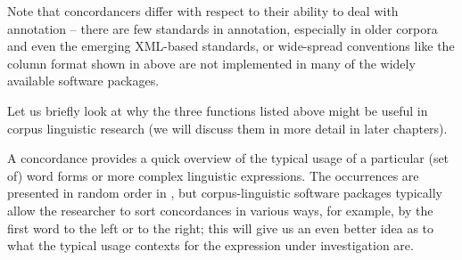 Note that concordancers  differ with respect to their ability to deal with annotation  -- there are few standards in annotation, especially in older corpora and even the emerging XML\hyp{}based standards, or wide\hyp{}spread conventions like the column format shown in  above are not implemented in many of the widely available software packages.

Let us briefly look at why the three functions listed above might be useful in corpus linguistic research (we will discuss them in more detail in later chapters).

A concordance  provides a quick overview of the typical usage of a particular (set of) word forms or more complex  linguistic expressions. The occurrences are presented in random order in ,  but corpus\hyp{}linguistic software packages typically allow the researcher to sort concordances in various ways, for example, by the first word to the left or to the right; this will give us an even better idea as to what the typical usage contexts for the expression under investigation are.

